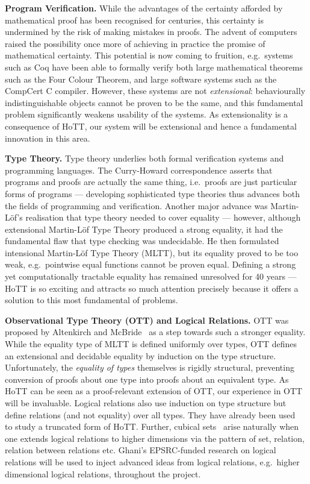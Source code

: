 \documentclass[a4paper,11pt]{article}
\newcommand{\eg}{{e.g.}\ }
\begin{document}
{\bf Program Verification.} While the advantages of the certainty
afforded by mathematical proof has been recognised for centuries, this
certainty is undermined by the risk of making mistakes in
proofs. The advent of computers raised the possibility once more of
achieving in practice the promise of mathematical certainty. This
potential is now coming to fruition, \eg systems such as Coq have been
able to formally verify both large mathematical theorems such as the
Four Colour Theorem, and large software systems such as the CompCert
C compiler. However, these systems are not {\em extensional}:
behaviourally indistinguishable objects cannot be proven to be the
same, and this fundamental problem significantly weakens usability of the
systems. As extensionality is a consequence of HoTT, our system
will be extensional and hence a fundamental innovation in this area.


{\bf Type Theory.} Type theory underlies both formal verification systems
and programming languages. The Curry-Howard correspondence asserts
that programs and proofs are actually the same thing, i.e.\ proofs are
just particular forms of programs --- developing sophisticated type
theories thus advances both the fields of programming and
verification. Another major advance was Martin-L\"of's realisation
that type theory needed to cover equality --- however, although
extensional Martin-L\"of Type Theory produced a strong equality, it
had the fundamental flaw that type checking was undecidable. He then
formulated intensional Martin-L\"of Type Theory (MLTT), but its
equality proved to be too weak, \eg pointwise equal functions cannot
be proven equal. Defining a strong yet computationally tractable
equality has remained unresolved for 40 years --- HoTT is so exciting
and attracts so much attention precisely because it offers a solution
to this most fundamental of problems.

{\bf Observational Type Theory (OTT) and Logical Relations.} OTT was
proposed by Altenkirch and McBride~\cite{alti:ott-conf} as a step
towards such a stronger equality. While the equality type of MLTT is
defined uniformly over types, OTT defines an extensional and decidable
equality by induction on the type structure. Unfortunately, the {\em
  equality of types} themselves is rigidly structural, preventing
conversion of proofs about one type into proofs about an equivalent
type. As HoTT can be seen as a proof-relevant extension of OTT, our
experience in OTT will be invaluable. Logical relations also use
induction on type structure but define relations (and not equality)
over all types.  They have already been
used~\cite{licataHarper:canonicity2d} to study a truncated form of
HoTT. Further, cubical sets~\cite{BezemM:cubsmt} arise naturally when
one extends logical relations to higher dimensions via the pattern of
set, relation, relation between relations etc. Ghani's EPSRC-funded
research on logical relations will be used to inject advanced ideas
from logical relations, \eg higher dimensional logical relations,
throughout the project.
\end{document}
